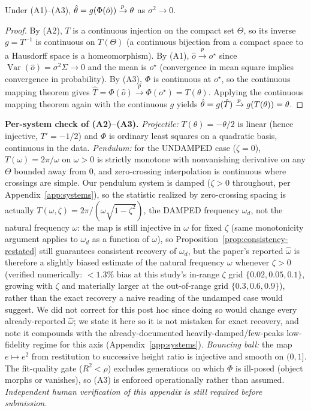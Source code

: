 \documentclass[10pt,twocolumn,letterpaper]{article}
\begin{document}
\begin{proposition}
\label{prop:consistency-restated}
Under (A1)--(A3), $\hat{\theta}=g(\Phi(\hat o)) \xrightarrow{p} \theta$ as
$\sigma^2\to 0$.
\end{proposition}

\begin{proof}
By (A2), $T$ is a continuous injection on the compact set $\Theta$, so its
inverse $g=T^{-1}$ is continuous on $T(\Theta)$ (a continuous bijection from a
compact space to a Hausdorff space is a homeomorphism). By (A1),
$\hat o \xrightarrow{p} o^\star$ since $\operatorname{Var}(\hat o)=\sigma^2\Sigma
\to 0$ and the mean is $o^\star$ (convergence in mean square implies
convergence in probability). By (A3), $\Phi$ is continuous at $o^\star$, so the
continuous mapping theorem gives $\hat T=\Phi(\hat o)\xrightarrow{p}
\Phi(o^\star)=T(\theta)$. Applying the continuous mapping theorem again with the
continuous $g$ yields $\hat{\theta}=g(\hat T)\xrightarrow{p} g(T(\theta))=\theta$.
\end{proof}

\textbf{Per-system check of (A2)--(A3).} \emph{Projectile:} $T(\theta)=-\theta/2$
is linear (hence injective, $T'=-1/2$) and $\Phi$ is ordinary least squares on a
quadratic basis, continuous in the data. \emph{Pendulum:} for the UNDAMPED
case ($\zeta=0$), $T(\omega)=2\pi/\omega$ on $\omega>0$ is strictly monotone
with nonvanishing derivative on any $\Theta$ bounded away from $0$, and
zero-crossing interpolation is continuous where crossings are simple. Our
pendulum system is damped ($\zeta>0$ throughout, per
Appendix~\ref{app:systems}), so the statistic realized by zero-crossing
spacing is actually $T(\omega,\zeta)=2\pi/(\omega\sqrt{1-\zeta^2})$, the
DAMPED frequency $\omega_d$, not the natural frequency $\omega$: the map is
still injective in $\omega$ for fixed $\zeta$ (same monotonicity argument
applies to $\omega_d$ as a function of $\omega$), so
Proposition~\ref{prop:consistency-restated}
still guarantees consistent recovery of $\omega_d$, but the paper's reported
$\hat\omega$ is therefore a slightly biased estimate of the natural
frequency $\omega$ whenever $\zeta>0$ (verified numerically: $<1.3\%$ bias at
this study's in-range $\zeta$ grid $\{0.02,0.05,0.1\}$, growing with $\zeta$
and materially larger at the out-of-range grid $\{0.3,0.6,0.9\}$), rather
than the exact recovery a naive reading of the undamped case would suggest.
We did not correct for this post hoc since doing so would change every
already-reported $\hat\omega$; we state it here so it is not mistaken for
exact recovery, and note it compounds with the already-documented
heavily-damped/few-peaks low-fidelity regime for this axis
(Appendix~\ref{app:systems}). \emph{Bouncing ball:} the map
$e\mapsto e^2$ from restitution to successive height ratio is injective and
smooth on $(0,1]$. The fit-quality gate ($R^2<\rho$) excludes generations on
which $\Phi$ is ill-posed (object morphs or vanishes), so (A3) is enforced
operationally rather than assumed. \emph{Independent human verification of this
appendix is still required before submission.}
\end{document}
